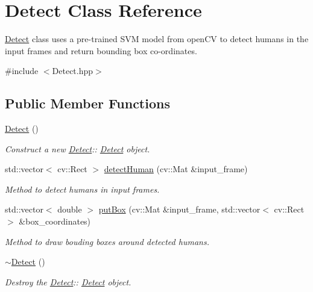 \hypertarget{classDetect}{}\section{Detect Class Reference}
\label{classDetect}


\hyperlink{classDetect}{Detect} class uses a pre-\/trained S\+VM model from open\+CV to detect humans in the input frames and return bounding box co-\/ordinates.  




{\ttfamily \#include $<$Detect.\+hpp$>$}

\subsection*{Public Member Functions}
\begin{DoxyCompactItemize}
\item 
\mbox{\label{classDetect_afefa427dddf8e308f93fd49424cc3680}} 
\hyperlink{classDetect_afefa427dddf8e308f93fd49424cc3680}{Detect} ()
\begin{DoxyCompactList}\small\item\em Construct a new \hyperlink{classDetect}{Detect}\+:\+: \hyperlink{classDetect}{Detect} object. \end{DoxyCompactList}\item 
std\+::vector$<$ cv\+::\+Rect $>$ \hyperlink{classDetect_a4fc823d563ef5b0ff3045ba0ddf41572}{detect\+Human} (cv\+::\+Mat \&input\+\_\+frame)
\begin{DoxyCompactList}\small\item\em Method to detect humans in input frames. \end{DoxyCompactList}\item 
std\+::vector$<$ double $>$ \hyperlink{classDetect_a5460dd416bb18ad8eefb78808ac41295}{put\+Box} (cv\+::\+Mat \&input\+\_\+frame, std\+::vector$<$ cv\+::\+Rect $>$ \&box\+\_\+coordinates)
\begin{DoxyCompactList}\small\item\em Method to draw bouding boxes around detected humans. \end{DoxyCompactList}\item 
\mbox{\label{classDetect_aa808b1146b9b8db316b25b02f0a6b5f3}} 
\hyperlink{classDetect_aa808b1146b9b8db316b25b02f0a6b5f3}{$\sim$\+Detect} ()
\begin{DoxyCompactList}\small\item\em Destroy the \hyperlink{classDetect}{Detect}\+:\+: \hyperlink{classDetect}{Detect} object. \end{DoxyCompactList}\end{DoxyCompactItemize}
